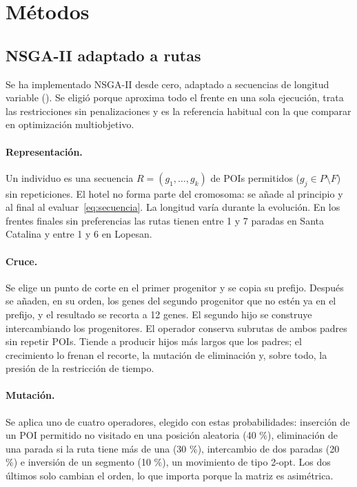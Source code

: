 \section{Métodos}
\label{sec:metodos}

\subsection{NSGA-II adaptado a rutas}
\label{sec:nsga2}

Se ha implementado NSGA-II \citep{deb2002} desde cero, adaptado a secuencias de longitud variable (). Se eligió porque aproxima todo el frente en una sola ejecución, trata las restricciones sin penalizaciones y es la referencia habitual con la que comparar en optimización multiobjetivo.

\paragraph{Representación.} Un individuo es una secuencia $R = (g_1,\dots,g_k)$ de POIs permitidos ($g_j \in P \setminus F$) sin repeticiones. El hotel no forma parte del cromosoma: se añade al principio y al final al evaluar~\eqref{eq:secuencia}. La longitud varía durante la evolución. En los frentes finales sin preferencias las rutas tienen entre 1 y 7 paradas en Santa Catalina y entre 1 y 6 en Lopesan.

\paragraph{Cruce.} Se elige un punto de corte en el primer progenitor y se copia su prefijo. Después se añaden, en su orden, los genes del segundo progenitor que no estén ya en el prefijo, y el resultado se recorta a 12 genes. El segundo hijo se construye intercambiando los progenitores. El operador conserva subrutas de ambos padres sin repetir POIs. Tiende a producir hijos más largos que los padres; el crecimiento lo frenan el recorte, la mutación de eliminación y, sobre todo, la presión de la restricción de tiempo.

\paragraph{Mutación.} Se aplica uno de cuatro operadores, elegido con estas probabilidades: inserción de un POI permitido no visitado en una posición aleatoria (40 \%), eliminación de una parada si la ruta tiene más de una (30 \%), intercambio de dos paradas (20 \%) e inversión de un segmento (10 \%), un movimiento de tipo 2-opt. Los dos últimos solo cambian el orden, lo que importa porque la matriz es asimétrica.

